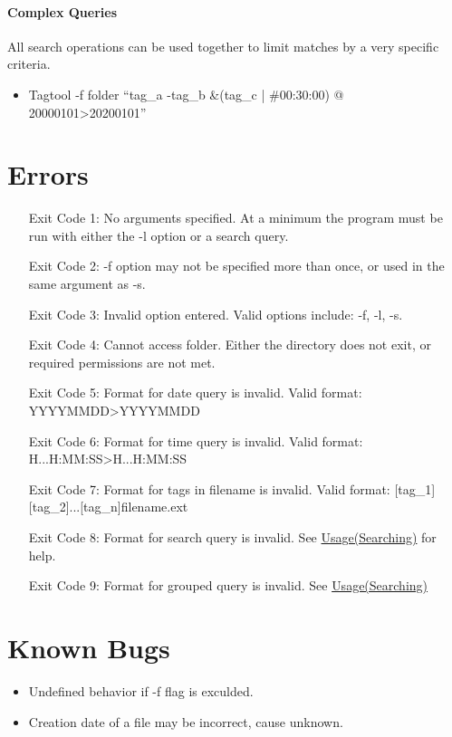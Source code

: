 \documentclass[12pt]{article}
\begin{document}
\paragraph{Complex Queries} All search operations can be used together to limit matches by a very specific criteria.
\begin{itemize}
    \item Tagtool -f folder ``tag\_a -tag\_b \&(tag\_c | \#00:30:00)  @ 20000101>20200101''
\end{itemize}
\section{Errors}\label{errors}
\begin{enumerate}
  \setlength\itemindent{50pt} 
  \item [Exit Code 1:] No arguments specified. At a minimum the program must be run with either the -l option or a search query.
  \item [Exit Code 2:] -f option may not be specified more than once, or used in the same argument as -s.
  \item [Exit Code 3:] Invalid option entered. Valid options include: -f, -l, -s.
  \item [Exit Code 4:] Cannot access folder. Either the directory does not exit, or required permissions are not met.
  \item [Exit Code 5:] Format for date query is invalid. Valid format: YYYYMMDD>YYYYMMDD
  \item [Exit Code 6:] Format for time query is invalid. Valid format: H...H:MM:SS>H...H:MM:SS
  \item [Exit Code 7:] Format for tags in filename is invalid. Valid format: [tag\_1][tag\_2]...[tag\_n]filename.ext
  \item [Exit Code 8:] Format for search query is invalid. See \hyperref[searching]{Usage(Searching)} for help.
  \item [Exit Code 9:] Format for grouped query is invalid. See \hyperref[searching]{Usage(Searching)}
\end{enumerate}
\section{Known Bugs}\label{bugs}
\begin{itemize}
  \item Undefined behavior if -f flag is exculded.
  \item Creation date of a file may be incorrect, cause unknown.
\end{itemize}
\end{document}
